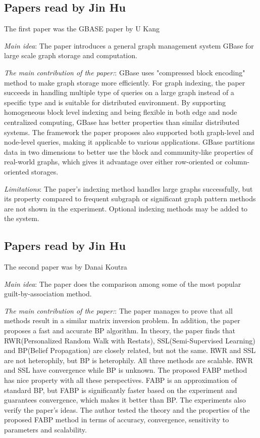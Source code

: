 \subsection{Papers read by Jin Hu}
The first paper was the GBASE paper by U Kang
\begin{itemize*}
\item {\em Main idea}: The paper introduces a general graph management system GBase for large scale graph storage and computation.
\item {\em The main contribution of the paper:}:
      GBase uses "compressed block encoding" method to make graph storage more efficiently.
    For graph indexing, the paper succeeds in handling multiple type of queries on a large graph instead of a specific type and is suitable for distributed environment. By supporting homogeneous block level indexing and being flexible in both edge and node centralized computing, GBase has better properties than similar distributed systems.
    The framework the paper proposes also supported both graph-level and node-level queries, making it applicable to various applications.
    GBase partitions data in two dimensions to better use the block and community-like properties of real-world graphs,
    which gives it advantage over either row-oriented or column-oriented storages.
\item {\em Limitations}:
      The paper's indexing method handles large graphs successfully, but its property compared to frequent subgraph
    or significant graph pattern methods are not shown in the experiment. Optional indexing methods may be added to
    the system.
\end{itemize*}

\subsection{Papers read by Jin Hu}
The second paper was by Danai Koutra
\begin{itemize*}
\item {\em Main idea}: The paper does the comparison among some of the most popular guilt-by-association method.
\item {\em The main contribution of the paper:}:
      The paper manages to prove that all methods result in a similar matrix inversion problem. In addition, the paper proposes a fast and accurate BP algorithm. In theory, the paper finds that RWR(Personalized Random Walk with Restats), SSL(Semi-Supervised Learning) and BP(Belief Propagation) are closely related, but not the same. RWR and SSL are not heterophily, but BP is heterophily. All three methods are scalable. RWR and SSL have convergence while BP is unknown. The proposed FABP method has nice property with all these perspectives. FABP is an approximation of standard BP, but FABP is significantly faster based on the experiment and guarantees convergence, which makes it better than BP. The experiments also verify the paper's ideas. The author tested the theory and the properties of the proposed FABP method in terms of accuracy, convergence, sensitivity to parameters and scalability.
\end{itemize*}

